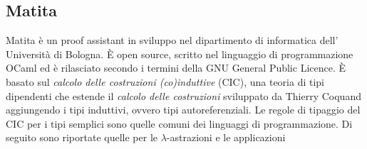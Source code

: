 \documentclass[12pt,a4paper]{report}
\begin{document}
\begin{prooftree}
\end{prooftree}

\begin{prooftree}
\end{prooftree}

\begin{prooftree}
\end{prooftree}

\begin{prooftree}
\end{prooftree}

\begin{prooftree}
\end{prooftree}

\begin{prooftree}
\end{prooftree}


\begin{prooftree}
\end{prooftree}

\subsection{Matita}
Matita è un  proof assistant in sviluppo nel dipartimento di informatica dell'
Università di Bologna. È open source, scritto nel linguaggio di programmazione 
OCaml ed è rilasciato secondo i termini della GNU General Public Licence.
È basato sul \textit{calcolo delle costruzioni (co)induttive} (CIC), una teoria di tipi
dipendenti che estende il \textit{calcolo delle costruzioni} sviluppato da
Thierry Coquand aggiungendo i tipi induttivi, ovvero tipi autoreferenziali.
Le regole di tipaggio del CIC per i tipi semplici sono quelle comuni dei linguaggi
di programmazione. Di seguito sono riportate quelle per le  $\lambda$-astrazioni e le applicazioni 
\end{document}
